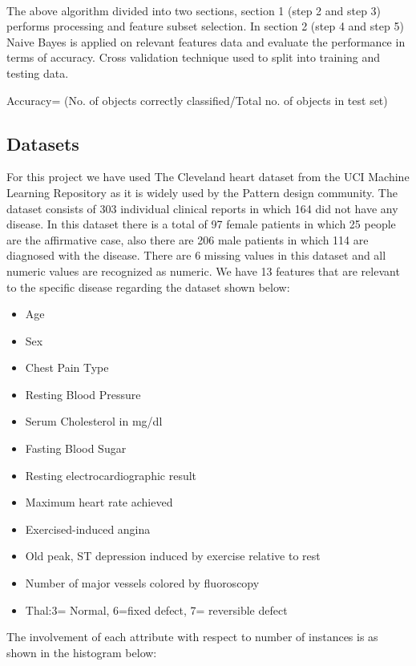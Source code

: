 \documentclass{book}
\begin{document}
    \paragraph{}
    The above algorithm divided into two sections, section 1 (step 2 and step 3) performs processing and feature subset selection. In section 2 (step 4 and step 5) Naive Bayes is applied on relevant features data and evaluate the performance in terms of accuracy. Cross validation technique used to split into training and testing data.	    
    \begin{center}
    	Accuracy= (No. of objects correctly classified/Total no. of objects in test set)  	
    \end{center}
    
    
    \subsection{Datasets}
    For this project we have used The Cleveland heart dataset from the UCI Machine Learning Repository as it is widely used by the Pattern design community. The dataset consists of 303 individual clinical reports in which 164 did not have any disease. In this dataset there is a total of 97 female patients in which 25 people are the affirmative case, also there are 206 male patients in which 114 are diagnosed with the disease. There are 6 missing values in this dataset and all numeric values are recognized as numeric.
    We have 13 features that are relevant to the specific disease regarding the dataset shown below:
    \begin{itemize}
    	\item Age
    	\item Sex
    	\item Chest Pain Type
    	\item Resting Blood Pressure 
    	\item Serum Cholesterol in mg/dl 
    	\item Fasting Blood Sugar
    	\item Resting electrocardiographic result
    	\item Maximum heart rate achieved 
    	\item Exercised-induced angina
    	\item Old peak, ST depression induced by exercise relative to rest 
    	\item Number of major vessels colored by fluoroscopy 
    	\item Thal:3= Normal, 6=fixed defect, 7= reversible defect
    \end{itemize}
    The involvement of each attribute with respect to number of instances is as shown in the histogram below:
    
\end{document}
